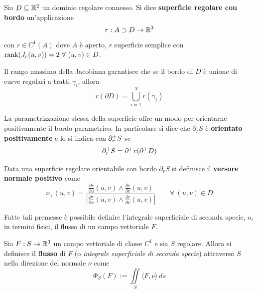  \begin{definition} \label{Def: Superficie regolare con bordo}
     Sia $D \subseteq \mathbb{R}^2$ un dominio regolare connesso. Si dice \textbf{superficie regolare con bordo} un'applicazione 
     \begin{equation}
         r: A \supset D \to \mathbb{R}^3
     \end{equation}
        con $r \in C^1(A)$ dove $A$ è aperto, $r$ superficie semplice con $\rank(J_r(u,v))=2\ \forall\ (u,v) \in D$.
 \end{definition}
 \begin{oss}
     Il rango massimo della Jacobiana garantisce che se il bordo di $D$ è unione di curve regolari a tratti $\gamma_i$, allora
     \begin{equation}
         r(\partial D)= \bigcup_{i=1}^N r(\gamma_i)
     \end{equation}
 \end{oss}
 \begin{oss}
     La parametrizzazione stessa della superficie offre un modo per orientarne positivamente il bordo parametrico. In particolare si dice che $\partial_r S$ è \textbf{orientato positivamente} e lo si indica con $\partial^+_r S$ se
     \begin{equation}
         \partial^+_r S = \partial^+ r( \partial^+ D)
     \end{equation}
 \end{oss}
 \begin{definition} \label{Def: Versore normale positivo}
     Data una superficie regolare orientabile con bordo $\partial_r S$ si definisce il \textbf{versore normale positivo} come
     \begin{equation}
         \nu_+(u,v) = \frac{\frac{\partial r}{\partial u} (u,v) \wedge \frac{\partial r}{\partial v}(u,v)}{\left|\frac{\partial r}{\partial u}(u,v) \wedge \frac{\partial r}{\partial v}(u,v)\right|} \qquad \forall\ (u,v) \in D
     \end{equation}
 \end{definition}
 Fatte tali premesse è possibile definire l'integrale superficiale di seconda specie, o, in termini fisici, il flusso di un campo vettoriale $F$.
 \begin{definition} \label{Def: Integrale superficiale di seconda specie}
     Sia $F: S \to \mathbb{R}^3$ un campo vettoriale di classe $C^1$ e sia $S$ regolare. Allora si definisce il \textbf{flusso} di $F$ (o \textit{integrale superficiale di seconda specie}) attraverso $S$ nella direzione del normale $\nu$ come
     \begin{equation}
         \Phi_S(F) := \iint\limits_S{\langle F, \nu \rangle}\, ds
     \end{equation}
 \end{definition}
